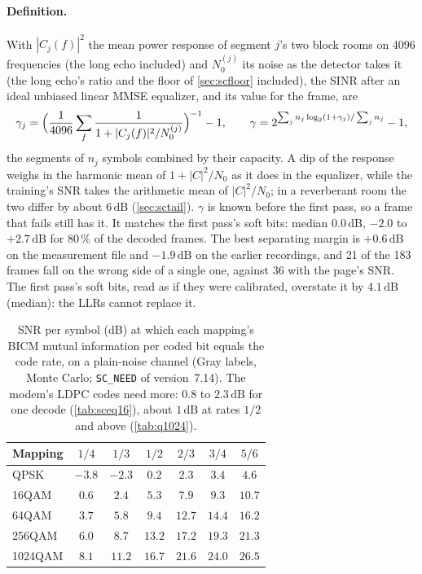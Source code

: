 \documentclass[11pt,a4paper]{article}
\newcommand{\dB}{\,\mathrm{dB}}
\newcommand{\code}[1]{\texttt{#1}}
\theoremstyle{remark}
\begin{document}
\paragraph{Definition.} With $|C_j(f)|^2$ the mean power response of segment $j$'s two block rooms on 4096 frequencies (the long echo included) and $N_0^{(j)}$ its noise as the detector takes it (the long echo's ratio and the floor of \cref{sec:scfloor} included), the SINR after an ideal unbiased linear MMSE equalizer, and its value for the frame, are
\begin{equation}
\gamma_j = \Bigl(\frac{1}{4096}\sum_f \frac{1}{1 + |C_j(f)|^2/N_0^{(j)}}\Bigr)^{-1} - 1, \qquad \gamma = 2^{\sum_j n_j \log_2(1 + \gamma_j)/\sum_j n_j} - 1,
\end{equation}
the segments of $n_j$ symbols combined by their capacity. A dip of the response weighs in the harmonic mean of $1 + |C|^2/N_0$ as it does in the equalizer, while the training's SNR takes the arithmetic mean of $|C|^2/N_0$; in a reverberant room the two differ by about $6\dB$ (\cref{sec:sctail}). $\gamma$ is known before the first pass, so a frame that fails still has it. It matches the first pass's soft bits: median $0.0\dB$, $-2.0$ to $+2.7\dB$ for $80\,\%$ of the decoded frames. The best separating margin is $+0.6\dB$ on the measurement file and $-1.9\dB$ on the earlier recordings, and 21 of the 183 frames fall on the wrong side of a single one, against 36 with the page's SNR. The first pass's soft bits, read as if they were calibrated, overstate it by $4.1\dB$ (median): the LLRs cannot replace it.

\begin{table}[ht]
\centering
\caption{SNR per symbol (dB) at which each mapping's BICM mutual information per coded bit equals the code rate, on a plain-noise channel (Gray labels, Monte Carlo; \code{SC\_NEED} of version~7.14). The modem's LDPC codes need more: $0.8$ to $2.3\dB$ for one decode (\cref{tab:sceq16}), about $1\dB$ at rates $1/2$ and above (\cref{tab:q1024}).}
\label{tab:sceq}
\small
\begin{tabular}{lcccccc}
\toprule
Mapping & $1/4$ & $1/3$ & $1/2$ & $2/3$ & $3/4$ & $5/6$\\
\midrule
QPSK & $-3.8$ & $-2.3$ & $0.2$ & $2.3$ & $3.4$ & $4.6$\\
16QAM & $0.6$ & $2.4$ & $5.3$ & $7.9$ & $9.3$ & $10.7$\\
64QAM & $3.7$ & $5.8$ & $9.4$ & $12.7$ & $14.4$ & $16.2$\\
256QAM & $6.0$ & $8.7$ & $13.2$ & $17.2$ & $19.3$ & $21.3$\\
1024QAM & $8.1$ & $11.2$ & $16.7$ & $21.6$ & $24.0$ & $26.5$\\
\bottomrule
\end{tabular}
\end{table}
\end{document}
